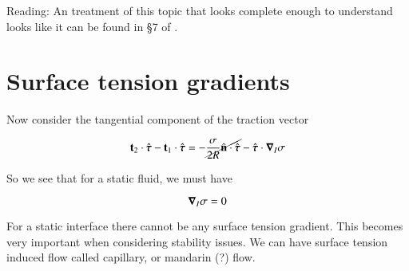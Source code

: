 %


Reading: An treatment of this topic that looks complete enough to understand looks like it can be found in \S 7 of \citep{landau1987course}.

\section{Surface tension gradients}

Now consider the tangential component of the traction vector

\begin{equation}\label{eqn:continuumL15:90}
\mathbf{t}_2 \cdot \hat{\boldsymbol{\tau}} - \mathbf{t}_1 \cdot \hat{\boldsymbol{\tau}} = - \cancel{ \frac{\sigma}{2 R} \hat{\mathbf{n}} \cdot \hat{\boldsymbol{\tau}}} - \hat{\boldsymbol{\tau}} \cdot \boldsymbol{\nabla}_I \sigma
\end{equation}

So we see that for a static fluid, we must have

\begin{equation}\label{eqn:continuumL15:110}
\boldsymbol{\nabla}_I \sigma = 0
\end{equation}

For a static interface there cannot be any surface tension gradient.  This becomes very important when considering stability issues.  We can have surface tension induced flow called capillary, or mandarin (?) flow.

